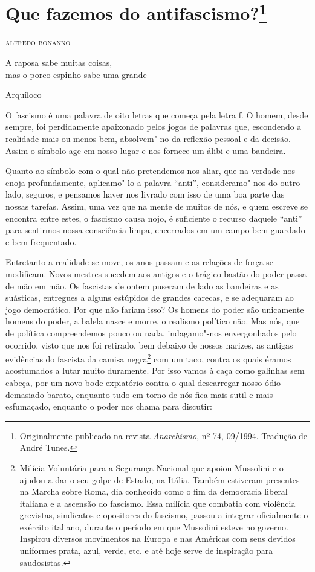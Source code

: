 \chapter{Que fazemos do antifascismo?\footnote[*]{Originalmente publicado na revista \emph{Anarchismo}, nº 74, 09/1994. Tradução de André Tunes.}}

\hfill{}\textsc{alfredo bonanno}

\bigskip

\epigraph{A raposa sabe muitas coisas,\\ mas o porco-espinho sabe uma grande}{Arquíloco}


O fascismo é uma palavra de oito letras que começa pela letra f. O
homem, desde sempre, foi perdidamente apaixonado pelos jogos de palavras
que, escondendo a realidade mais ou menos bem, absolvem"-no da reflexão
pessoal e da decisão. Assim o símbolo age em nosso lugar e nos fornece
um álibi e uma bandeira.

Quanto ao símbolo com o qual não pretendemos nos aliar, que na verdade
nos enoja profundamente, aplicamo"-lo a palavra ``anti'', consideramo"-nos
do outro lado, seguros, e pensamos haver nos livrado com isso de uma boa
parte das nossas tarefas. Assim, uma vez que na mente de muitos de nós,
e quem escreve se encontra entre estes, o fascismo causa nojo, é
suficiente o recurso daquele ``anti'' para sentirmos nossa consciência
limpa, encerrados em um campo bem guardado e bem frequentado.

Entretanto a realidade se move, os anos passam e as relações de força se
modificam. Novos mestres sucedem aos antigos e o trágico bastão do poder
passa de mão em mão. Os fascistas de ontem puseram de lado as bandeiras
e as suásticas, entregues a alguns estúpidos de grandes carecas, e se
adequaram ao jogo democrático. Por que não fariam isso? Os homens do
poder são unicamente homens do poder, a balela nasce e morre, o realismo
político não. Mas nós, que de política compreendemos pouco ou nada,
indagamo"-nos envergonhados pelo ocorrido, visto que nos foi retirado,
bem debaixo de nossos narizes, as antigas evidências do fascista da
camisa negra\footnote{Milícia Voluntária para a Segurança Nacional que apoiou Mussolini e o
  ajudou a dar o seu golpe de Estado, na Itália. Também estiveram
  presentes na Marcha sobre Roma, dia conhecido como o fim da democracia
  liberal italiana e a ascensão do fascismo. Essa milícia que combatia
  com violência grevistas, sindicatos e opositores do fascismo, passou a
  integrar oficialmente o exército italiano, durante o período em que
  Mussolini esteve no governo. Inspirou diversos movimentos na Europa e
  nas Américas com seus devidos uniformes prata, azul, verde, etc. e até
  hoje serve de inspiração para saudosistas.} com um taco, contra os quais éramos acostumados a lutar
muito duramente. Por isso vamos à caça como galinhas sem cabeça, por um
novo bode expiatório contra o qual descarregar nosso ódio demasiado
barato, enquanto tudo em torno de nós fica mais sutil e mais esfumaçado,
enquanto o poder nos chama para discutir:

